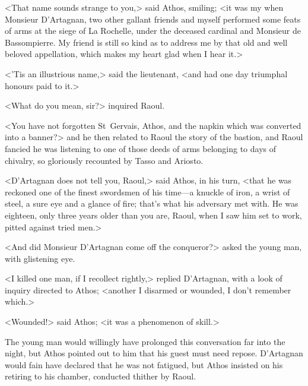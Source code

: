 <That name sounds strange to you,> said Athos, smiling; <it was my  when Monsieur D'Artagnan, two other gallant friends and myself performed some feats of arms at the siege of La Rochelle, under the deceased cardinal and Monsieur de Bassompierre. My friend is still so kind as to address me by that old and well beloved appellation, which makes my heart glad when I hear it.>

<'Tis an illustrious name,> said the lieutenant, <and had one day triumphal honours paid to it.>

<What do you mean, sir?> inquired Raoul.

<You have not forgotten St~Gervais, Athos, and the napkin which was converted into a banner?> and he then related to Raoul the story of the bastion, and Raoul fancied he was listening to one of those deeds of arms belonging to days of chivalry, so gloriously recounted by Tasso and Ariosto.

<D'Artagnan does not tell you, Raoul,> said Athos, in his turn, <that he was reckoned one of the finest swordsmen of his time—a knuckle of iron, a wrist of steel, a sure eye and a glance of fire; that's what his adversary met with. He was eighteen, only three years older than you are, Raoul, when I saw him set to work, pitted against tried men.>

<And did Monsieur D'Artagnan come off the conqueror?> asked the young man, with glistening eye.

<I killed one man, if I recollect rightly,> replied D'Artagnan, with a look of inquiry directed to Athos; <another I disarmed or wounded, I don't remember which.>

<Wounded!> said Athos; <it was a phenomenon of skill.>

The young man would willingly have prolonged this conversation far into the night, but Athos pointed out to him that his guest must need repose. D'Artagnan would fain have declared that he was not fatigued, but Athos insisted on his retiring to his chamber, conducted thither by Raoul. 